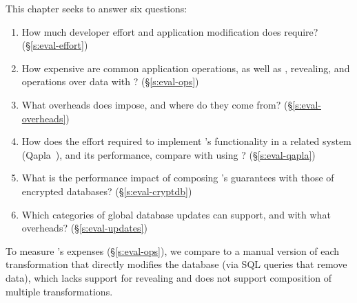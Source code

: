 This chapter seeks to answer six questions:
%
\begin{enumerate}[nosep]
 \item How much developer effort and application modification does \sys require? (\S\ref{s:eval-effort})
%
\item How expensive are common application operations, as well as
  \xxing, revealing, and operations over \xxed data with \sys? (\S\ref{s:eval-ops})

\item What overheads does \sys impose, and where do they come from?
    (\S\ref{s:eval-overheads})

\item 
    How does the effort required to implement \sys's
    functionality in a related system (Qapla~\cite{qapla}),
    and its performance, compare with using \sys?
    (\S\ref{s:eval-qapla})

\item 
    What is the performance impact of composing \sys's guarantees
    with those of encrypted databases?
        (\S\ref{s:eval-cryptdb})

\item 
    Which categories of global database updates can \sys
        support, and with what overheads? (\S\ref{s:eval-updates})
%
\end{enumerate}

To measure \sys's expenses (\S\ref{s:eval-ops}), we compare \sys to a manual version of each
\xxing transformation that directly modifies the database (\eg via SQL queries
that remove data), which lacks support for revealing and does not support
composition of multiple transformations. 

%

%
%
%
%

